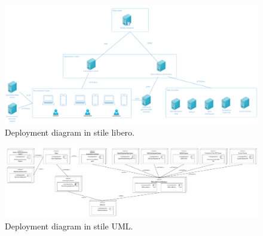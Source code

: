 \begin{landscape}
	\begin{figure}[b]
		\centering
		\includegraphics[width=1.1\linewidth]{./Iterazione 0/OtherFiles/DeploymentDiagramNonFormale}
		\caption{Deployment diagram in stile libero.}
		\label{fig:DeplymnetDiagramNonFormale}
	\end{figure}
\end{landscape}
\begin{landscape}
	\begin{figure}[b]
		\centering
		\includegraphics[width=1.1\linewidth]{./Iterazione 0/OtherFiles/DeplymentDiagramFormale}
		\caption{Deployment diagram in stile UML.}
		\label{fig:DeplymnetDiagramFormale}
	\end{figure}
\end{landscape}
